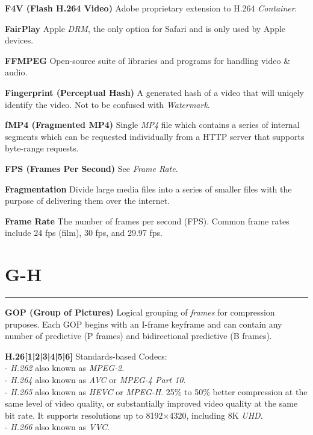 \smallskip
\textbf{F4V (Flash H.264 Video)}
Adobe proprietary extension to H.264 \textit{Container}.

\smallskip
\textbf{FairPlay}
Apple \textit{DRM}, the only option for Safari and is only used by Apple devices.

\smallskip
\textbf{FFMPEG}
Open-source suite of libraries and programs for handling video \& audio.

\smallskip
\textbf{Fingerprint (Perceptual Hash)}
A generated hash of a video that will uniqely identify the video. Not to be confused with \textit{Watermark}.

\smallskip
\textbf{fMP4 (Fragmented MP4)}
Single \textit{MP4} file which contains a series of internal segments which can be requested individually from a HTTP server that supports byte-range requests.

\smallskip
\textbf{FPS (Frames Per Second)}
See \textit{Frame Rate}.

\smallskip
\textbf{Fragmentation}
Divide large media files into a series of smaller files with the purpose of delivering them over the internet.

\smallskip
\textbf{Frame Rate}
The number of frames per second (FPS). Common frame rates include 24 fps (film), 30 fps, and 29.97 fps.


\section{G-H}
\hrule

\medskip
\textbf{GOP (Group of Pictures)}
Logical grouping of \textit{frames} for compression pruposes. Each GOP begins with an I-frame keyframe and can contain any number of predictive (P frames) and bidirectional predictive (B frames).

\smallskip
\textbf{H.26[1|2|3|4|5|6]}
Standards-based Codecs:\\
 - \textit{H.262} also known as \textit{MPEG-2}.\\
 - \textit{H.264} also known as \textit{AVC} or  \textit{MPEG-4 Part 10}.\\
 - \textit{H.265} also known as \textit{HEVC} or \textit{MPEG-H}. 25\% to 50\% better compression at the same level of video quality, or substantially improved video quality at the same bit rate. It supports resolutions up to 8192×4320, including 8K \textit{UHD}.\\
 - \textit{H.266} also known as \textit{VVC}.

